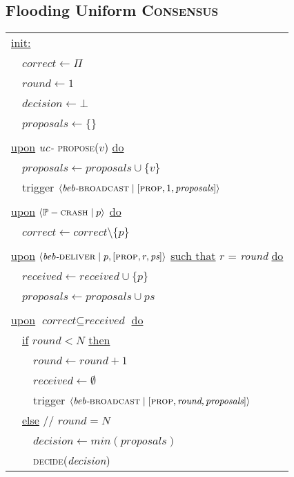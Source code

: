 \documentclass{article}
\begin{document}
\begin{adjustwidth}{2em}{2em}
		\subsection{Flooding Uniform \textsc{Consensus}}
		\begin{center}
			\begin{tabular}{l}
				\underline{init:} \\
				\ \ $\textit{correct} \leftarrow \Pi$ \\
				\ \ $\textit{round} \leftarrow 1$ \\
				\ \ $\textit{decision} \leftarrow \bot$ \\
				\ \ $\textit{proposals} \leftarrow \{ \}$ \\
				\\
				\underline{upon} \textit{uc-} \textsc{propose}($v$) \underline{do} \\
				\ \ $\textit{proposals} \leftarrow \textit{proposals} \cup \{ v \}$ \\
				\ \ trigger $\langle \textit{beb-}\textsc{broadcast} \mid [\textsc{prop}, 1,\textit{proposals}] \rangle$ \\
				\\
				\underline{upon} $\langle \mathbb{P}-\textsc{crash} \mid p \rangle$ \underline{do} \\
				\ \ $\textit{correct} \leftarrow \textit{correct} \setminus \{ p \}$ \\
				\\
				\underline{upon} $\langle \textit{beb-}\textsc{deliver} \mid p, [\textsc{prop}, r,\textit{ps}] \rangle$ \underline{such that} $r$ = \textit{round} \underline{do} \\
				\ \ $\textit{received} \leftarrow \textit{received} \cup \{ p \}$ \\
				\ \ $\textit{proposals} \leftarrow \textit{proposals} \cup ps$ \\
				\\
				\underline{upon} $\textit{correct} \subseteq \textit{received}$ \underline{do} \\
				\ \ \underline{if} $\textit{round} < N$ \underline{then} \\
				\ \ \ \ $\textit{round} \leftarrow \textit{round} + 1$ \\
				\ \ \ \ $\textit{received} \leftarrow \emptyset$ \\
				\ \ \ \ trigger $\langle \textit{beb-}\textsc{broadcast} \mid [\textsc{prop}, \textit{round},\textit{proposals}] \rangle$ \\
				\ \ \underline{else} \hspace{8cm} // $\textit{round} = N$ \\
				\ \ \ \ $\textit{decision} \leftarrow min(\textit{proposals})$ \\
				\ \ \ \ \textsc{decide}(\textit{decision})
			\end{tabular}
		\end{center}

\end{adjustwidth}
\end{document}
